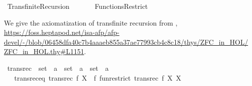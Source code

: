 %
\begin{isabellebody}%
%
%
\isadelimdocument
%
\endisadelimdocument
%
\isatagdocument
\isanewline
%
\isamarkuptrue%
%
\endisatagdocument
{\isafolddocument}%
%
\isadelimdocument
%
\endisadelimdocument
%
\isadelimtheory
%
\endisadelimtheory
%
\isatagtheory
{}\isamarkupfalse%
\ Transfinite{\isacharunderscore}{\kern0pt}Recursion\isanewline
\ \ \isanewline
\ \ \ \ Functions{\isacharunderscore}{\kern0pt}Restrict\isanewline
{}%
\endisatagtheory
{\isafoldtheory}%
%
\isadelimtheory
%
\endisadelimtheory
%
\isadelimdocument
%
\endisadelimdocument
%
\isatagdocument
%
\isamarkuptrue%
%
\endisatagdocument
{\isafolddocument}%
%
\isadelimdocument
%
\endisadelimdocument
%
\begin{isamarkuptext}%
We give the axiomatization of transfinite recursion from \cite{ZFC_in_HOL_AFP}, \url{https://foss.heptapod.net/isa-afp/afp-devel/-/blob/06458dfa40c7b4aaaeb855a37ae77993cb4c8c18/thys/ZFC_in_HOL/ZFC_in_HOL.thy\#L1151}.%
\end{isamarkuptext}\isamarkuptrue%
\isamarkupfalse%
\ transrec\ {\isacharcolon}{\kern0pt}{\isacharcolon}{\kern0pt}\ {\isachardoublequoteopen}{\isacharparenleft}{\kern0pt}{\isacharparenleft}{\kern0pt}set\ {\isasymRightarrow}\ {\isacharprime}{\kern0pt}a{\isacharparenright}{\kern0pt}\ {\isasymRightarrow}\ set\ {\isasymRightarrow}\ {\isacharprime}{\kern0pt}a{\isacharparenright}{\kern0pt}\ {\isasymRightarrow}\ set\ {\isasymRightarrow}\ {\isacharprime}{\kern0pt}a{\isachardoublequoteclose}\isanewline
\ \ \ transrec{\isacharunderscore}{\kern0pt}eq{\isacharcolon}{\kern0pt}\ {\isachardoublequoteopen}transrec\ f\ X\ {\isacharequal}{\kern0pt}\ f\ {\isacharparenleft}{\kern0pt}fun{\isacharunderscore}{\kern0pt}restrict\ {\isacharparenleft}{\kern0pt}transrec\ f{\isacharparenright}{\kern0pt}\ X{\isacharparenright}{\kern0pt}\ X{\isachardoublequoteclose}\isanewline
%
\isadelimtheory
\isanewline
%
\endisadelimtheory
%
\isatagtheory
{}\isamarkupfalse%
%
\endisatagtheory
{\isafoldtheory}%
%
\isadelimtheory
%
\endisadelimtheory
%
\end{isabellebody}%
\endinput
